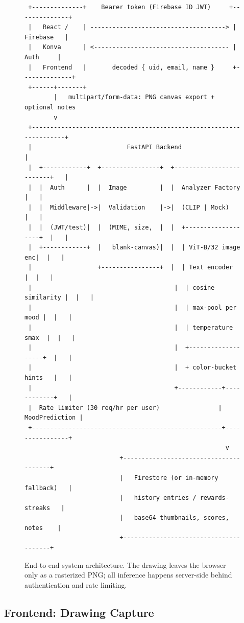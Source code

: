 \documentclass[10pt,twocolumn,letterpaper]{article}
\begin{document}
\begin{figure}[t]
\centering
\small
\begin{verbatim}
 +--------------+    Bearer token (Firebase ID JWT)     +--------------+
 |   React /    | -------------------------------------> |   Firebase   |
 |   Konva      | <------------------------------------- |     Auth     |
 |   Frontend   |       decoded { uid, email, name }     +--------------+
 +------+-------+
        |   multipart/form-data: PNG canvas export + optional notes
        v
 +--------------------------------------------------------------------+
 |                          FastAPI Backend                            |
 |  +------------+  +----------------+  +-------------------------+   |
 |  |  Auth      |  |  Image         |  |  Analyzer Factory       |   |
 |  |  Middleware|->|  Validation    |->|  (CLIP | Mock)          |   |
 |  |  (JWT/test)|  |  (MIME, size,  |  |  +-------------------+  |   |
 |  +------------+  |   blank-canvas)|  |  | ViT-B/32 image enc|  |   |
 |                  +----------------+  |  | Text encoder      |  |   |
 |                                       |  | cosine similarity |  |   |
 |                                       |  | max-pool per mood |  |   |
 |                                       |  | temperature smax  |  |   |
 |                                       |  +-------------------+  |   |
 |                                       |  + color-bucket hints   |   |
 |                                       +------------+------------+   |
 |  Rate limiter (30 req/hr per user)                |  MoodPrediction |
 +----------------------------------------------------+----------------+
                                                       v
                          +---------------------------------------+
                          |   Firestore (or in-memory fallback)   |
                          |   history entries / rewards-streaks   |
                          |   base64 thumbnails, scores, notes    |
                          +---------------------------------------+
\end{verbatim}
\caption{End-to-end system architecture. The drawing leaves the browser only as a rasterized PNG; all inference happens server-side behind authentication and rate limiting.}
\label{fig:architecture}
\end{figure}

\subsection{Frontend: Drawing Capture}
\end{document}
